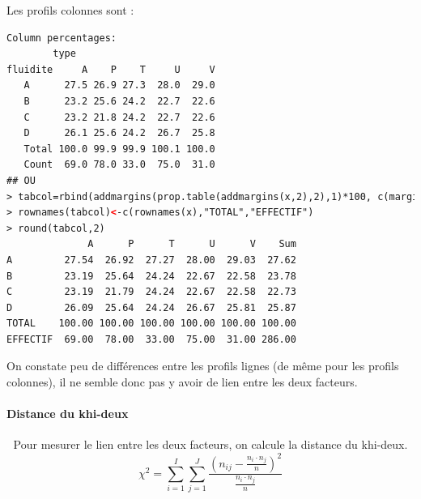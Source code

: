 Les profils colonnes sont :
\begin{lstlisting}[language=html]
Column percentages:
        type
fluidite     A    P    T     U     V
   A      27.5 26.9 27.3  28.0  29.0
   B      23.2 25.6 24.2  22.7  22.6
   C      23.2 21.8 24.2  22.7  22.6
   D      26.1 25.6 24.2  26.7  25.8
   Total 100.0 99.9 99.9 100.1 100.0
   Count  69.0 78.0 33.0  75.0  31.0
## OU
> tabcol=rbind(addmargins(prop.table(addmargins(x,2),2),1)*100, c(margin.table(x,2),sum(x)))
> rownames(tabcol)<-c(rownames(x),"TOTAL","EFFECTIF")
> round(tabcol,2)
              A      P      T      U      V    Sum
A         27.54  26.92  27.27  28.00  29.03  27.62
B         23.19  25.64  24.24  22.67  22.58  23.78
C         23.19  21.79  24.24  22.67  22.58  22.73
D         26.09  25.64  24.24  26.67  25.81  25.87
TOTAL    100.00 100.00 100.00 100.00 100.00 100.00
EFFECTIF  69.00  78.00  33.00  75.00  31.00 286.00
\end{lstlisting}
On constate peu de différences entre les profils lignes (de même pour les profils
colonnes), il ne semble donc pas y avoir de lien entre les deux facteurs.
\paragraph{Distance du khi-deux}\textcolor{white}{.}\newline
Pour mesurer le lien entre les deux facteurs, on calcule la distance du khi-deux.
$$\chi^{2} = \sum_{i=1}^{I}\sum_{j=1}^{J} \frac{(n_{ij}-\frac{n_{i}\cdot n_{j}}{n})^{2}}{\frac{n_{i}\cdot n_{j}}{n}}
$$

